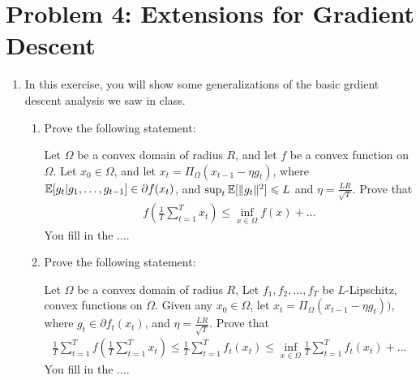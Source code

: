 \documentclass[12pt]{article}
\begin{document}
\section*{Problem 4: Extensions for Gradient Descent}
\begin{enumerate}
\item In this exercise, you will show some generalizations of the basic grdient
descent analysis we saw in class.

\begin{enumerate}
\item Prove the following statement:
\begin{proposition*} Let $\Omega$ be a convex domain of radius $R$, and let $f$ be a convex function on $\Omega$. Let $x_0 \in \Omega$, and let $x_{t} = \Pi_{\Omega}(x_{t-1} - \eta g_t )$, where $\operatorname*{\mathbb{E}}[g_t | g_1,\dots,g_{t-1}] \in \partial f(x_t)$, and $\sup_{t} \operatorname*{\mathbb{E}}[\|g_t\|^2] \leqslant L$ and $\eta = \frac{LR}{\sqrt{T}}$.  Prove that 
\begin{eqnarray}
 f(\frac{1}{T}\sum_{t=1}^T x_t) \le \inf_{x \in \Omega} f(x) + \dots
\end{eqnarray}
You fill in the $\dots$.
\end{proposition*}
\item Prove the following statement:
\begin{proposition*}  Let $\Omega$ be a convex domain of radius $R$, Let $f_1,f_2,\dots,f_T$ be $L$-Lipschitz, convex functions on $\Omega$. Given any $x_0 \in \Omega$, let $x_{t} = \Pi_{\Omega}(x_{t-1} - \eta g_t ))$, where $g_t \in \partial f_t(x_t)$, and  $\eta = \frac{LR}{\sqrt{T}}$. Prove that
\begin{eqnarray}
\frac{1}{T}\sum_{t=1}^{T} f(\frac{1}{T}\sum_{t=1}^T x_t) \le \frac{1}{T}\sum_{t=1}^Tf_t(x_t) \le \inf_{x \in \Omega}\frac{1}{T}\sum_{t=1}^Tf_t(x_t) + \dots
\end{eqnarray}
You fill in the $\dots$.
\end{proposition*}
\end{enumerate}


\end{enumerate}
\end{document}
